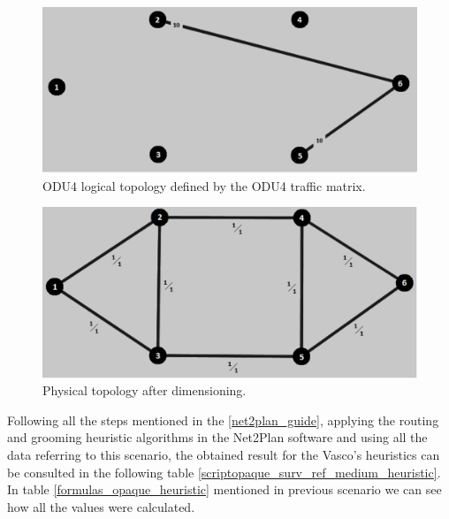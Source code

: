 \begin{figure}[H]
\centering
\includegraphics[width=13cm]{sdf/heuristic/opaque_survivability/figures/logical_topology_odu4_medium}
\caption{ODU4 logical topology defined by the ODU4 traffic matrix.}
\label{logical_ODU4_surv_ref_medium_heuristic}
\end{figure}

\begin{figure}[H]
\centering
\includegraphics[width=13cm]{sdf/heuristic/opaque_survivability/figures/physical_topology}
\caption{Physical topology after dimensioning.}
\label{physical_topology_surv_ref_medium_heuristic}
\end{figure}

Following all the steps mentioned in the \ref{net2plan_guide}, applying the routing and grooming heuristic algorithms in the Net2Plan software and using all the data referring to this scenario, the obtained result for the Vasco's heuristics can be consulted in the following table \ref{scriptopaque_surv_ref_medium_heuristic}. In table \ref{formulas_opaque_heuristic} mentioned in previous scenario we can see how all the values were calculated.\\

